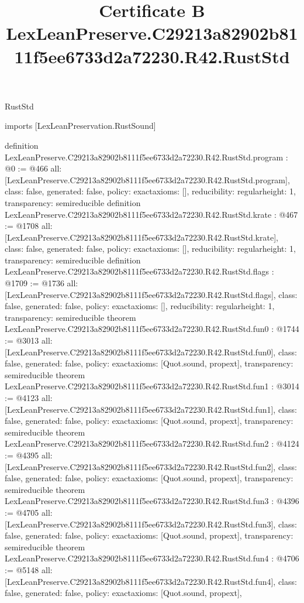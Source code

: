 \begin{lexlean}{RustStd}
\title{Certificate B LexLeanPreserve.C29213a82902b8111f5ee6733d2a72230.R42.RustStd}
\begin{coremodule}
imports [LexLeanPreservation.RustSound]

definition LexLeanPreserve.C29213a82902b8111f5ee6733d2a72230.R42.RustStd.program : @0 := @466 {
  all: [LexLeanPreserve.C29213a82902b8111f5ee6733d2a72230.R42.RustStd.program],
  class: false,
  generated: false,
  policy: exact{axioms: []},
  reducibility: regular{height: 1},
  transparency: semireducible
}
definition LexLeanPreserve.C29213a82902b8111f5ee6733d2a72230.R42.RustStd.krate : @467 := @1708 {
  all: [LexLeanPreserve.C29213a82902b8111f5ee6733d2a72230.R42.RustStd.krate],
  class: false,
  generated: false,
  policy: exact{axioms: []},
  reducibility: regular{height: 1},
  transparency: semireducible
}
definition LexLeanPreserve.C29213a82902b8111f5ee6733d2a72230.R42.RustStd.flags : @1709 := @1736 {
  all: [LexLeanPreserve.C29213a82902b8111f5ee6733d2a72230.R42.RustStd.flags],
  class: false,
  generated: false,
  policy: exact{axioms: []},
  reducibility: regular{height: 1},
  transparency: semireducible
}
theorem LexLeanPreserve.C29213a82902b8111f5ee6733d2a72230.R42.RustStd.fun0 : @1744 := @3013 {
  all: [LexLeanPreserve.C29213a82902b8111f5ee6733d2a72230.R42.RustStd.fun0],
  class: false,
  generated: false,
  policy: exact{axioms: [Quot.sound, propext]},
  transparency: semireducible
}
theorem LexLeanPreserve.C29213a82902b8111f5ee6733d2a72230.R42.RustStd.fun1 : @3014 := @4123 {
  all: [LexLeanPreserve.C29213a82902b8111f5ee6733d2a72230.R42.RustStd.fun1],
  class: false,
  generated: false,
  policy: exact{axioms: [Quot.sound, propext]},
  transparency: semireducible
}
theorem LexLeanPreserve.C29213a82902b8111f5ee6733d2a72230.R42.RustStd.fun2 : @4124 := @4395 {
  all: [LexLeanPreserve.C29213a82902b8111f5ee6733d2a72230.R42.RustStd.fun2],
  class: false,
  generated: false,
  policy: exact{axioms: [Quot.sound, propext]},
  transparency: semireducible
}
theorem LexLeanPreserve.C29213a82902b8111f5ee6733d2a72230.R42.RustStd.fun3 : @4396 := @4705 {
  all: [LexLeanPreserve.C29213a82902b8111f5ee6733d2a72230.R42.RustStd.fun3],
  class: false,
  generated: false,
  policy: exact{axioms: [Quot.sound, propext]},
  transparency: semireducible
}
theorem LexLeanPreserve.C29213a82902b8111f5ee6733d2a72230.R42.RustStd.fun4 : @4706 := @5148 {
  all: [LexLeanPreserve.C29213a82902b8111f5ee6733d2a72230.R42.RustStd.fun4],
  class: false,
  generated: false,
  policy: exact{axioms: [Quot.sound, propext]},
}
\end{coremodule}
\end{lexlean}
